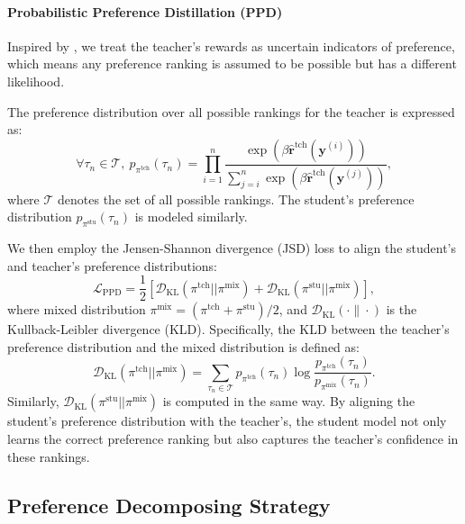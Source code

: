 \paragraph{Probabilistic Preference Distillation (PPD)}
Inspired by \citet{cao-2007-listnet}, we treat the teacher's rewards as uncertain indicators of preference, which means any preference ranking is assumed to be possible but has a different likelihood. 

The preference distribution over all possible rankings for the teacher is expressed as:
\begin{equation}
    \forall \tau_n \in \mathcal{T},\ p_{\pi^{\text{tch}}}(\tau_n) = \prod_{i=1}^n \frac{\exp\left(\beta\hat{\boldsymbol{r}}^{\text{tch}}(\boldsymbol{y}^{(i)}) \right)}{\sum_{j=i}^n \exp\left(\beta\hat{\boldsymbol{r}}^{\text{tch}}(\boldsymbol{y}^{(j)}) \right)},
\end{equation}
where $\mathcal{T}$ denotes the set of all possible rankings. The student’s preference distribution $p_{\pi^{\text{stu}}}(\tau_n)$ is modeled similarly.

We then employ the Jensen-Shannon divergence (JSD) loss to align the student's and teacher's preference distributions:
\begin{equation}
\label{eq:ppd}
    \mathcal{L}_\text{PPD}=
    \frac{1}{2} \left[\mathcal{D}_\text{KL}(\pi^{\text{tch}} || \pi^\text{mix}) + \mathcal{D}_\text{KL}(\pi^{\text{stu}} || \pi^\text{mix}) \right],    
\end{equation}
where mixed distribution $\pi^\text{mix} = (\pi^{\text{tch}} + \pi^{\text{stu}}) / 2$, and $\mathcal{D}_\text{KL}(\cdot \| \cdot)$ is the Kullback-Leibler divergence (KLD). Specifically, the KLD between the teacher's preference distribution and the mixed distribution is defined as:
\begin{equation*}
\mathcal{D}_\text{KL}(\pi^{\text{tch}} || \pi^\text{mix})= \sum_{\tau_n \in \mathcal{T}} p_{\pi^{\text{tch}}}(\tau_n) \log \frac{p_{\pi^{\text{tch}}}(\tau_n)}{p_{\pi^{\text{mix}}}(\tau_n)}.
\end{equation*}
Similarly, $\mathcal{D}_\text{KL}(\pi^{\text{stu}} || \pi^\text{mix})$ is computed in the same way. By aligning the student's preference distribution with the teacher's, the student model not only learns the correct preference ranking but also captures the teacher’s confidence in these rankings.

\subsection{Preference Decomposing Strategy}
\label{sec:phase-4}

